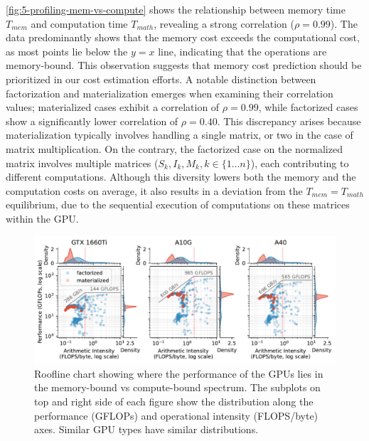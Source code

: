 \autoref{fig:5-profiling-mem-vs-compute} shows the relationship between memory time $T_{mem}$ and computation time $T_{math}$, revealing a strong correlation ($\rho = 0.99$). The data predominantly shows that the memory cost exceeds the computational cost, as most points lie below the $y=x$ line, indicating that the operations are memory-bound. This observation suggests that memory cost prediction should be prioritized in our cost estimation efforts. A notable distinction between factorization and materialization emerges when examining their correlation values; materialized cases exhibit a correlation of $\rho = 0.99$, while factorized cases show a significantly lower correlation of $\rho = 0.40$. This discrepancy arises because materialization typically involves handling a single matrix, or two in the case of matrix multiplication. On the contrary, the factorized case on the normalized matrix involves multiple matrices ($S_k,I_k,M_k, k \in \{1 \ldots n\}$), each contributing to different computations. Although this diversity lowers both the memory and the computation costs on average, it also results in a deviation from the $T_{mem} = T_{math}$ equilibrium, due to the sequential execution of computations on these matrices within the GPU.

\begin{figure}
  \centering
  \includegraphics[width=\linewidth]{chapters/05_cost_estimation/figures/roofline-plot.pdf}
  \caption[Roofline chart comparing F/M, per GPU]{Roofline chart showing where the performance of the GPUs lies in the memory-bound vs compute-bound spectrum. The subplots on top and right side of each figure show the distribution along the performance (GFLOPs) and operational intensity (FLOPS/byte) axes. Similar GPU types have similar distributions.}
  \label{fig:5-roofline-plot}
\end{figure}

